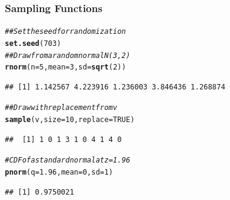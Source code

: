 \documentclass{beamer}\usepackage[]{graphicx}\usepackage[]{color}
\makeatletter
\newcommand{\hlnum}[1]{\textcolor[rgb]{0.686,0.059,0.569}{#1}}%
\newcommand{\hlcom}[1]{\textcolor[rgb]{0.678,0.584,0.686}{\textit{#1}}}%
\newcommand{\hlstd}[1]{\textcolor[rgb]{0.345,0.345,0.345}{#1}}%
\newcommand{\hlkwc}[1]{\textcolor[rgb]{0.333,0.667,0.333}{#1}}%
\newcommand{\hlkwd}[1]{\textcolor[rgb]{0.737,0.353,0.396}{\textbf{#1}}}%
\newenvironment{kframe}{%
 \def\at@end@of@kframe{}%
 \ifinner\ifhmode%
  \def\at@end@of@kframe{\end{minipage}}%
  \begin{minipage}{\columnwidth}%
 \fi\fi%
 \def\FrameCommand##1{\hskip\@totalleftmargin \hskip-\fboxsep
 \colorbox{shadecolor}{##1}\hskip-\fboxsep
     \hskip-\linewidth \hskip-\@totalleftmargin \hskip\columnwidth}%
 \MakeFramed {\advance\hsize-\width
   \@totalleftmargin\z@ \linewidth\hsize
   \@setminipage}}%
 {\par\unskip\endMakeFramed%
 \at@end@of@kframe}
\newenvironment{knitrout}{}{} %
\makeatother
\begin{document}
\begin{frame}[fragile]\frametitle{Sampling Functions}
\begin{knitrout}\footnotesize
{}\color{fgcolor}\begin{kframe}
\begin{alltt}
\hlcom{## Set the seed for randomization}
\hlkwd{set.seed}\hlstd{(}\hlnum{703}\hlstd{)}
\hlcom{## Draw from a random normal N(3, 2)}
\hlkwd{rnorm}\hlstd{(}\hlkwc{n} \hlstd{=} \hlnum{5}\hlstd{,} \hlkwc{mean} \hlstd{=} \hlnum{3}\hlstd{,} \hlkwc{sd} \hlstd{=} \hlkwd{sqrt}\hlstd{(}\hlnum{2}\hlstd{))}
\end{alltt}
\begin{verbatim}
## [1] 1.142567 4.223916 1.236003 3.846436 1.268874
\end{verbatim}
\begin{alltt}
\hlcom{## Draw with replacement from v}
\hlkwd{sample}\hlstd{(v,} \hlkwc{size} \hlstd{=} \hlnum{10}\hlstd{,} \hlkwc{replace} \hlstd{=} \hlnum{TRUE}\hlstd{)}
\end{alltt}
\begin{verbatim}
##  [1] 1 0 1 3 1 0 4 1 4 0
\end{verbatim}
\begin{alltt}
\hlcom{# CDF of a standard normal at z = 1.96}
\hlkwd{pnorm}\hlstd{(}\hlkwc{q} \hlstd{=} \hlnum{1.96}\hlstd{,} \hlkwc{mean} \hlstd{=} \hlnum{0}\hlstd{,} \hlkwc{sd} \hlstd{=} \hlnum{1}\hlstd{)}
\end{alltt}
\begin{verbatim}
## [1] 0.9750021
\end{verbatim}
\end{kframe}
\end{knitrout}
\end{frame}
\end{document}
